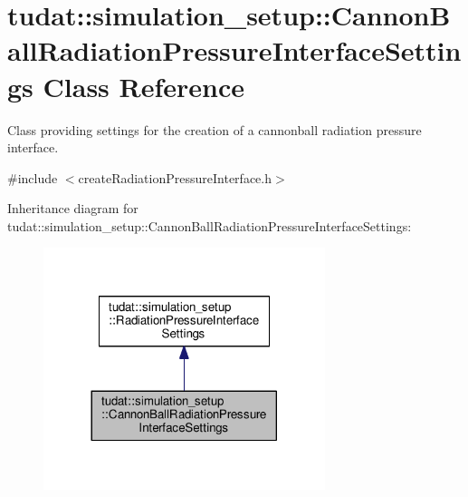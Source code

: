 \hypertarget{classtudat_1_1simulation__setup_1_1CannonBallRadiationPressureInterfaceSettings}{}\section{tudat\+:\+:simulation\+\_\+setup\+:\+:Cannon\+Ball\+Radiation\+Pressure\+Interface\+Settings Class Reference}
\label{classtudat_1_1simulation__setup_1_1CannonBallRadiationPressureInterfaceSettings}


Class providing settings for the creation of a cannonball radiation pressure interface.  




{\ttfamily \#include $<$create\+Radiation\+Pressure\+Interface.\+h$>$}



Inheritance diagram for tudat\+:\+:simulation\+\_\+setup\+:\+:Cannon\+Ball\+Radiation\+Pressure\+Interface\+Settings\+:
\nopagebreak
\begin{figure}[H]
\begin{center}
\leavevmode
\includegraphics[width=233pt]{classtudat_1_1simulation__setup_1_1CannonBallRadiationPressureInterfaceSettings__inherit__graph}
\end{center}
\end{figure}


